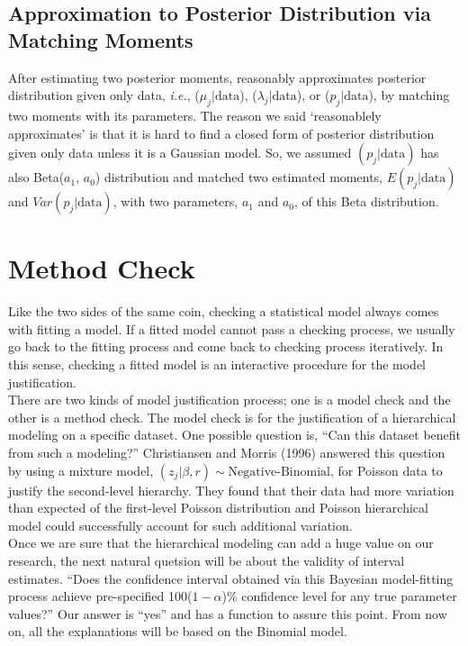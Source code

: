 \documentclass[article]{jss}
\begin{document}
\subsection[Approximation to Posterior Distribution by Moment Matching]{Approximation to Posterior Distribution via Matching Moments}
After estimating two posterior moments,  reasonably approximates posterior distribution given only data, \emph{i.e.}, ($\mu_{j}\vert \textrm{data}$), ($\lambda_{j}\vert \textrm{data}$), or ($p_{j}\vert \textrm{data}$), by matching two moments with its parameters. The reason we said `reasonablely approximates' is that it is hard to find a closed form of posterior distribution given only data unless it is a Gaussian model. So, we assumed $(p_{j}\vert \textrm{data})$ has also Beta($a_{1}$, $a_{0}$) distribution and matched two estimated moments, $E(p_{j}\vert \textrm{data})$ and $Var(p_{j}\vert \textrm{data})$, with two parameters, $a_{1}$ and $a_{0}$, of this Beta distribution. 

\section[Method Check]{Method Check}
Like the two sides of the same coin, checking a statistical model always comes with fitting a model. If a fitted model cannot pass a checking process, we usually go back to the fitting process and come back to checking process iteratively. In this sense, checking a fitted model is an interactive procedure for the model justification.
\\

There are two kinds of model justification process; one is a model check and the other is a method check. The model check is for the justification of a hierarchical modeling on a specific dataset. One possible question is, ``Can this dataset benefit from such a modeling?'' Christiansen and Morris (1996) answered this question by using a mixture model, $(z_{j}\vert \beta, r)\sim\textrm{Negative-Binomial}$, for Poisson data to justify the second-level hierarchy. They found that their data had more variation than expected of the first-level Poisson distribution and Poisson hierarchical model could successfully account for such additional variation.
\\

Once we are sure that the hierarchical modeling can add a huge value on our research, the next natural quetsion will be about the validity of interval estimates. ``Does the confidence interval obtained via this Bayesian model-fitting process achieve pre-specified 100($1-\alpha$)\% confidence level for any true parameter values?'' Our answer is ``yes'' and  has a function to assure this point. From now on, all the explanations will be based on the Binomial model.
\end{document}
